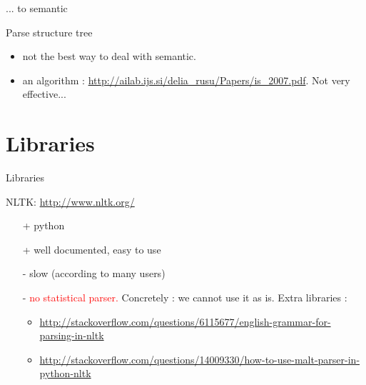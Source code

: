 \documentclass[10pt]{beamer}
\begin{document}
\begin{frame}{... to semantic}

Parse structure tree 
\begin{itemize}
	\item not the best way to deal with semantic.
	\item an algorithm : \url{http://ailab.ijs.si/delia_rusu/Papers/is_2007.pdf}. Not very effective...
\end{itemize}


		
\end{frame}


\section{Libraries}

\begin{frame}{Libraries}

\begin{exampleblock}{NLTK: \url{http://www.nltk.org/}}
	\begin{itemize}
		\item[+] python
		\item[+] well documented, easy to use
		\item[-] slow (according to many users)
		\item[-] \textcolor{red}{no statistical parser.} Concretely : we cannot use it as is. Extra libraries : 
				\begin{itemize}
					\item \url{http://stackoverflow.com/questions/6115677/english-grammar-for-parsing-in-nltk}
					\item \url{http://stackoverflow.com/questions/14009330/how-to-use-malt-parser-in-python-nltk}
				\end{itemize}
	\end{itemize}
\end{exampleblock}

\end{frame}
\end{document}
